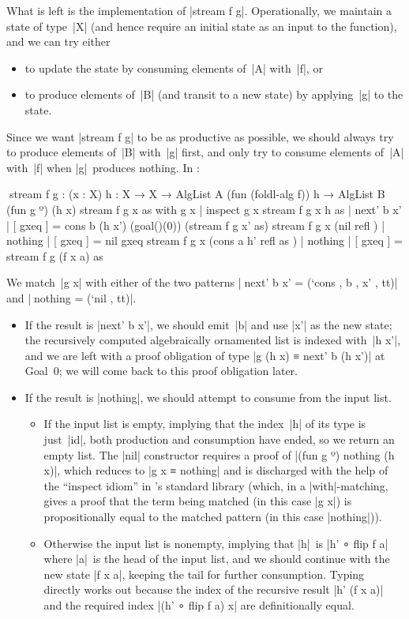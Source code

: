 What is left is the implementation of |stream f g|.
Operationally, we maintain a state of type~|X| (and hence require an initial state as an input to the function), and we can try either
\begin{itemize}
\item to update the state by consuming elements of~|A| with~|f|, or
\item to produce elements of~|B| (and transit to a new state) by applying~|g| to the state.
\end{itemize}
Since we want |stream f g| to be as productive as possible, we should always try to produce elements of~|B| with~|g| first, and only try to consume elements of~|A| with~|f| when |g|~produces nothing.
In \Agda:
\begin{code}
^^^stream f g :  (x : X) {h : X → X} →
                 AlgList A (fun (foldl-alg f)) h → AlgList B (fun g º) (h x)
stream f g x      as                      with g x      | inspect g x
stream f g x {h}  as                      | next' b x'  | [ gxeq ] =  cons b (h x') (goal()(0))
                                                                        (stream f g x' as)
stream f g x      (nil        refl     )  | nothing     | [ gxeq ] =  nil gxeq
stream f g x      (cons a h'  refl as  )  | nothing     | [ gxeq ] =  stream f g (f x a) as
\end{code}
We match~|g x| with either of the two patterns |^^^next' b x' = (`cons , b , x' , tt)| and |^^^nothing = (`nil , tt)|.
\begin{itemize}
\item If the result is |next' b x'|, we should emit~|b| and use |x'| as the new state; the recursively computed algebraically ornamented list is indexed with~|h x'|, and we are left with a proof obligation of type |g (h x) ≡ next' b (h x')| at Goal~0; we will come back to this proof obligation later.
\item If the result is |nothing|, we should attempt to consume from the input list.
\begin{itemize}
\item If the input list is empty, implying that the index~|h| of its type is just~|id|, both production and consumption have ended, so we return an empty list.
The |nil| constructor requires a proof of |(fun g º) nothing (h x)|, which reduces to |g x ≡ nothing| and is discharged with the help of the ``inspect idiom'' in \Agda's standard library (which, in a |with|-matching, gives a proof that the term being matched (in this case |g x|) is propositionally equal to the matched pattern (in this case |nothing|)).
\item Otherwise the input list is nonempty, implying that |h|~is |h' ∘ flip f a| where |a|~is the head of the input list, and we should continue with the new state |f x a|, keeping the tail for further consumption.
Typing directly works out because the index of the recursive result |h' (f x a)| and the required index |(h' ∘ flip f a) x| are definitionally equal.
\end{itemize}
\end{itemize}

